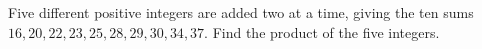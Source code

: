 Five different positive integers are added two at a time, giving the ten sums $16,20,22,23,25,28,29,30,34,37$. Find the product of the five integers.
